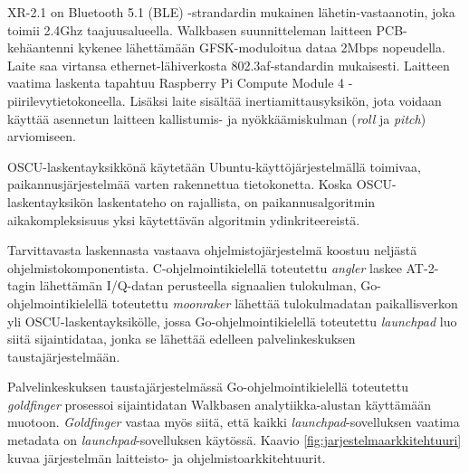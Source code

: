 \documentclass[
  12pt,
  a4paper, twoside]{book}
\begin{document}
XR-2.1 on Bluetooth 5.1 (BLE) -strandardin mukainen lähetin-vastaanotin, joka toimii 2.4Ghz taajuusalueella. Walkbasen suunnitteleman laitteen PCB-kehäantenni kykenee lähettämään GFSK-moduloitua dataa 2Mbps nopeudella. Laite saa virtansa ethernet-lähiverkosta 802.3af-standardin mukaisesti. Laitteen vaatima laskenta tapahtuu Raspberry Pi Compute Module 4 -piirilevytietokoneella. Lisäksi laite sisältää inertiamittausyksikön, jota voidaan käyttää asennetun laitteen kallistumis- ja nyökkäämiskulman (\emph{roll} ja \emph{pitch}) arviomiseen.

OSCU-laskentayksikkönä käytetään Ubuntu-käyttöjärjestelmällä toimivaa, paikannusjärjestelmää varten rakennettua tietokonetta. Koska OSCU-laskentayksikön laskentateho on rajallista, on paikannusalgoritmin aikakompleksisuus yksi käytettävän algoritmin ydinkriteereistä.

Tarvittavasta laskennasta vastaava ohjelmistojärjestelmä koostuu neljästä ohjelmistokomponentista. C-ohjelmointikielellä toteutettu \emph{angler} laskee AT-2-tagin lähettämän I/Q-datan perusteella signaalien tulokulman, Go-ohjelmointikielellä toteutettu \emph{moonraker} lähettää tulokulmadatan paikallisverkon yli OSCU-laskentayksikölle, jossa Go-ohjelmointikielellä toteutettu \emph{launchpad} luo siitä sijaintidataa, jonka se lähettää edelleen palvelinkeskuksen taustajärjestelmään.

Palvelinkeskuksen taustajärjestelmässä Go-ohjelmointikielellä toteutettu \emph{goldfinger} prosessoi sijaintidatan Walkbasen analytiikka-alustan käyttämään muotoon. \emph{Goldfinger} vastaa myös siitä, että kaikki \emph{launchpad}-sovelluksen vaatima metadata on \emph{launchpad}-sovelluksen käytössä. Kaavio \ref{fig:jarjestelmaarkkitehtuuri} kuvaa järjestelmän laitteisto- ja ohjelmistoarkkitehtuurit.
\end{document}

